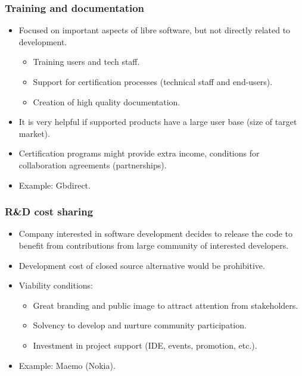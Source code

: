 \begin{frame}
 \frametitle{Training and documentation}
 \begin{itemize}
  \item Focused on important aspects of libre software, but not directly related to development.
  \begin{itemize}
   \item Training users and tech staff.
   \item Support for certification processes (technical staff and end-users).
   \item Creation of high quality documentation.
  \end{itemize}
  \item It is very helpful if supported products have a large user base (size of target market).
  \item Certification programs might provide extra income, conditions for collaboration agreements
(partnerships).
  \item Example: Gbdirect.
 \end{itemize}
\end{frame}

\begin{frame}
 \frametitle{R\&D cost sharing}
 \begin{itemize}
  \item Company interested in software development decides to release the code to benefit from
contributions from large community of interested developers.
  \item Development cost of closed source alternative would be prohibitive.
  \item Viability conditions:
  \begin{itemize}
   \item Great branding and public image to attract attention from stakeholders.
   \item Solvency to develop and nurture community participation.
   \item Investment in project support (IDE, events, promotion, etc.).
  \end{itemize}
   \item Example: Maemo (Nokia).
 \end{itemize}
\end{frame}

